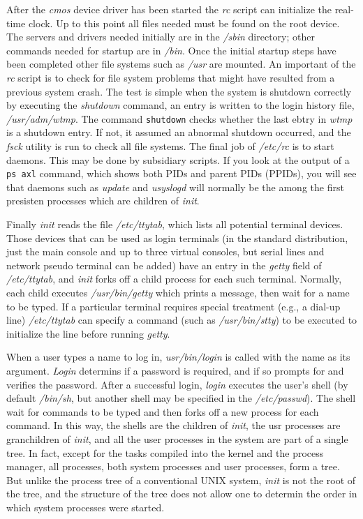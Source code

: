 \documentclass{book}
\newcommand {\sys} [1] {\textsl{#1}}
\newcommand {\cmd} [1] {\texttt{#1}}
\begin{document}
After the \sys{cmos} device driver has been started the \sys{rc} script can initialize the real-time clock.
Up to this point all files needed must be found on the root device.
The servers and drivers needed initially are in the \sys{/sbin} directory;
other commands needed for startup are in \sys{/bin}.
Once the initial startup steps have been completed other file systems such as \sys{/usr} are mounted.
An important of the \sys{rc} script is to check for file system problems that might have resulted from a previous system crash.
The test is simple when the system is shutdown correctly by executing the \sys{shutdown} command, 
an entry is written to the login history file, \sys{/usr/adm/wtmp}.
The command \cmd{shutdown} checks whether the last ebtry in \sys{wtmp} is a shutdown entry.
If not, it assumed an abnormal shutdown occurred, and the \sys{fsck} utility is run to check all file systems.
The final job of \sys{/etc/rc} is to start daemons.
This may be done by subsidiary scripts.
If you look at the output of a \cmd{ps axl} command, which shows both PIDs and parent PIDs (PPIDs),
you will see that daemons such as \sys{update} and \sys{usyslogd} will normally be the among the first presisten processes
which are children of \sys{init}.

Finally \sys{init} reads the file \sys{/etc/ttytab}, which lists all potential terminal devices.
Those devices that can be used as login terminals 
(in the standard distribution, just the main console and up to three virtual consoles, 
but serial lines and network pseudo terminal can be added) 
have an entry in the \sys{getty} field of \sys{/etc/ttytab}, 
and \sys{init} forks off a child process for each such terminal.
Normally, each child executes \sys{/usr/bin/getty} which prints a message, then wait for a name to be typed.
If a particular terminal requires special treatment (e.g., a dial-up line) \sys{/etc/ttytab} can specify a command 
(such as \sys{/usr/bin/stty}) to be executed to initialize the line before running \sys{getty}.

When a user types a name to log in, \sys{usr/bin/login} is called with the name as its argument.
\sys{Login} determins if a password is required, and if so prompts for and verifies the password.
After a successful login, \sys{login} executes the user's shell (by default \sys{/bin/sh}, but another shell may be specified in the \sys{/etc/passwd}).
The shell wait for commands to be typed and then forks off a new process for each command.
In this way, the shells are the children of \sys{init}, the usr processes are granchildren of \sys{init},
and all the user processes in the system are part of a single tree.
In fact, except for the tasks compiled into the kernel and the process manager, all processes, 
both system processes and user processes, form a tree.
But unlike the process tree of a conventional UNIX system, \sys{init} is not the root of the tree,
and the structure of the tree does not allow one to determin the order in which system processes were started.
\end{document}
